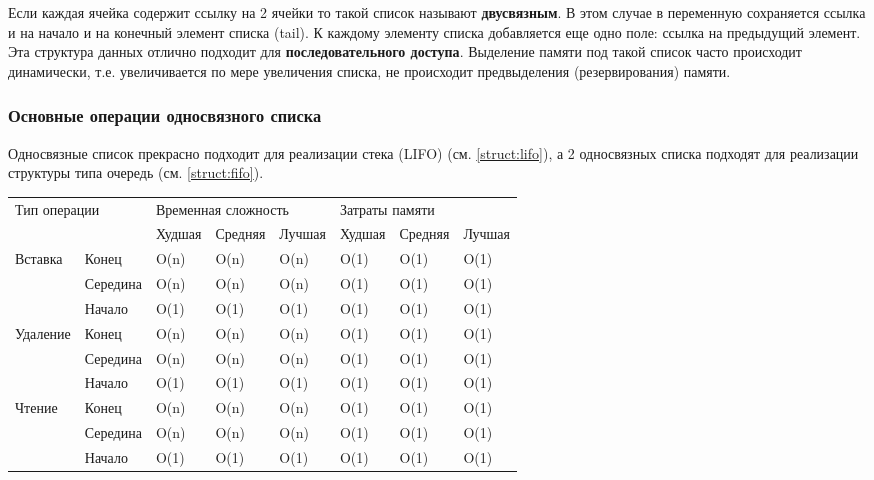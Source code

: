 		Если каждая ячейка содержит ссылку на 2 ячейки то такой список называют \textbf{двусвязным}. В этом случае в переменную сохраняется ссылка и на начало и на конечный элемент списка (tail). К каждому элементу списка добавляется еще одно поле: ссылка на предыдущий элемент. Эта структура данных отлично подходит для \textbf{последовательного доступа}.
		Выделение памяти под такой список часто происходит динамически, т.е. увеличивается по мере увеличения списка, не происходит предвыделения (резервирования) памяти.
			\subsubsection{Основные операции односвязного списка}
			Односвязные список прекрасно подходит для реализации стека (LIFO) (см. \ref{struct:lifo}), а 2 односвязных списка подходят для реализации структуры типа очередь (см. \ref{struct:fifo}). 
\begin{table}[h!]
\begin{tabular}{|l|l|l|l|l|l|l|l|}
\hline
\multicolumn{2}{|l|}{\multirow{2}{*}{Тип операции}} & \multicolumn{3}{l|}{Временная сложность} & \multicolumn{3}{l|}{Затраты памяти} \\ \cline{3-8} 
\multicolumn{2}{|l|}{}                  & Худшая & Средняя & Лучшая & Худшая & Средняя & Лучшая		\\ \hline
\multirow{3}{*}{Вставка}     & Конец 	& O(n) 	 & O(n)    & O(n)   & O(1)   & O(1)    & O(1)		\\ \cline{2-8} 
                             & Середина & O(n) 	 & O(n)    & O(n)   & O(1)   & O(1)    & O(1)		\\ \cline{2-8} 
                             & Начало 	& O(1) 	 & O(1)    & O(1)   & O(1)   & O(1)    & O(1)		\\ \hline
\multirow{3}{*}{Удаление}    & Конец 	& O(n) 	 & O(n)    & O(n)   & O(1)   & O(1)    & O(1)		\\ \cline{2-8} 
                             & Середина & O(n) 	 & O(n)    & O(n)   & O(1)   & O(1)    & O(1)		\\ \cline{2-8} 
                             & Начало 	& O(1) 	 & O(1)    & O(1)   & O(1)   & O(1)    & O(1)		\\ \hline
\multirow{3}{*}{Чтение}      & Конец 	& O(n) 	 & O(n)    & O(n)   & O(1)   & O(1)    & O(1)		\\ \cline{2-8} 
                             & Середина & O(n) 	 & O(n)    & O(n)   & O(1)   & O(1)    & O(1)		\\ \cline{2-8} 
                             & Начало 	& O(1) 	 & O(1)    & O(1)   & O(1)   & O(1)    & O(1)		\\ \hline
							
\end{tabular}
\end{table}

